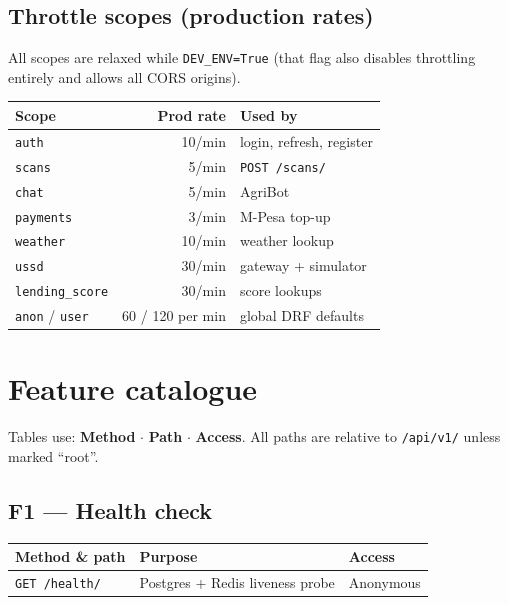 \documentclass[11pt,a4paper]{article}
\newcommand{\code}[1]{\texttt{\allowbreak #1\allowbreak}}
\begin{document}
\subsection*{Throttle scopes (production rates)}

All scopes are relaxed while \code{DEV\_ENV=True} (that flag also disables
throttling entirely and allows all CORS origins).

\begin{center}
\small
\begin{tabular}{@{} l r l @{}}
\toprule
\textbf{Scope} & \textbf{Prod rate} & \textbf{Used by} \\
\midrule
\code{auth}        & 10/min   & login, refresh, register \\
\code{scans}       & 5/min    & \code{POST /scans/} \\
\code{chat}        & 5/min    & AgriBot \\
\code{payments}    & 3/min    & M-Pesa top-up \\
\code{weather}     & 10/min   & weather lookup \\
\code{ussd}        & 30/min   & gateway + simulator \\
\code{lending\_score} & 30/min & score lookups \\
\code{anon} / \code{user} & 60 / 120 per min & global DRF defaults \\
\bottomrule
\end{tabular}
\end{center}

\section{Feature catalogue}

Tables use: \textbf{Method} $\cdot$ \textbf{Path} $\cdot$ \textbf{Access}.
All paths are relative to \code{/api/v1/} unless marked ``root''.

\subsection{F1 --- Health check}
\begin{center}
\small
\begin{tabularx}{\textwidth}{@{} l X l @{}}
\toprule
\textbf{Method \& path} & \textbf{Purpose} & \textbf{Access} \\
\midrule
\code{GET /health/} & Postgres + Redis liveness probe & Anonymous \\
\bottomrule
\end{tabularx}
\end{center}
\end{document}
